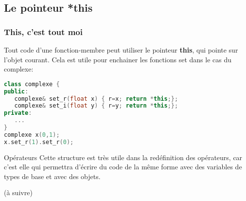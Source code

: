 \documentclass{beamer}
\begin{document}
\subsection{Le pointeur *this}
\begin{frame}[fragile=singleslide,shrink=20]
\frametitle {This, c'est tout moi}
Tout code d'une fonction-membre peut utiliser le pointeur \textbf{this}, qui pointe sur l'objet courant.
Cela est utile pour enchainer les fonctions set dans le cas du complexe:
\begin{lstlisting}[language=c++]
class complexe {
public:
   complexe& set_r(float x) { r=x; return *this;};
   complexe& set_i(float y) { r=y; return *this;};
private:
   ...
}
complexe x(0,1);
x.set_r(1).set_r(0);
\end{lstlisting}

\begin{block}{Opérateurs}
Cette structure est très utile dans la redéfinition des opérateurs, car c'est elle qui
permettra d'écrire du code de la même forme avec des variables de types de base et avec des objets.
\end{block}
\end{frame}

\begin{frame}
(à suivre)
\end{frame}
\end{document}
